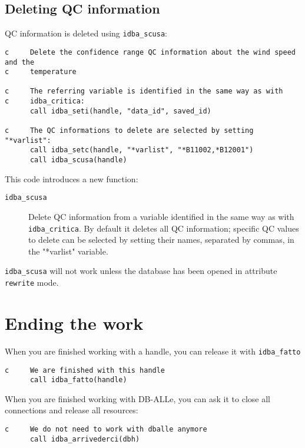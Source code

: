 \documentclass[draft,12pt,a4paper,twoside]{book}
\begin{document}
\subsection{Deleting QC information}

QC information is deleted using {\tt idba\_scusa}:

\label{fun-idba_scusa}

\begin{verbatim}
c     Delete the confidence range QC information about the wind speed and the
c     temperature

c     The referring variable is identified in the same way as with
c     idba_critica:
      call idba_seti(handle, "data_id", saved_id)

c     The QC informations to delete are selected by setting "*varlist":
      call idba_setc(handle, "*varlist", "*B11002,*B12001")
      call idba_scusa(handle)
\end{verbatim}

This code introduces a new function:

\begin{description}
\item[{\tt idba\_scusa}]
  Delete QC information from a variable identified in the same way as with
  {\tt idba\_critica}.  By default it deletes all QC information; specific QC
  values to delete can be selected by setting their names, separated by commas,
  in the "*varlist" variable.
\end{description}

{\tt idba\_scusa} will not work unless the database has been opened in
attribute {\tt rewrite} mode.


\section{Ending the work}

When you are finished working with a handle, you can release it with {\tt idba\_fatto}

\label{fun-idba_fatto}

\begin{verbatim}
c     We are finished with this handle
      call idba_fatto(handle)
\end{verbatim}

When you are finished working with DB-ALLe, you can ask it to close all
connections and release all resources:

\label{fun-idba_arrivederci}

\begin{verbatim}
c     We do not need to work with dballe anymore
      call idba_arrivederci(dbh)
\end{verbatim}
\end{document}
